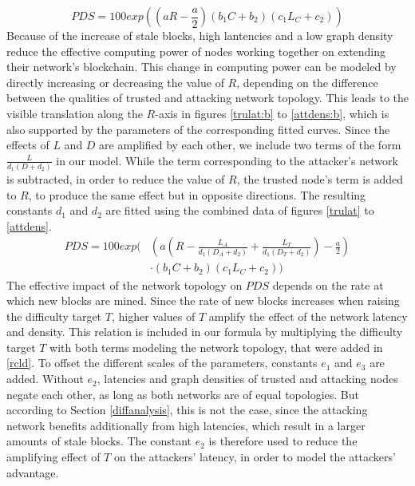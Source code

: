 \documentclass[a4paper,12pt,twoside]{report}
\begin{document}
\begin{equation}\label{rcl}
PDS = 100 exp \left( \left( a R- \frac{a}{2} \right) \left( b_1C+b_2 \right) \left( c_1L_C+c_2 \right) \right)
\end{equation}
Because of the increase of stale blocks, high lantencies and a low graph density reduce the effective computing power of nodes working together on extending their network's blockchain. This change in computing power can be modeled by directly increasing or decreasing the value of $R$, depending on the difference between the qualities of trusted and attacking network topology. This leads to the visible translation along the $R$-axis in figures \ref{trulat:b} to \ref{attdens:b}, which is also supported by the parameters of the corresponding fitted curves.  Since the effects of $L$ and $D$ are amplified by each other, we include two terms of the form $\frac{L}{d_1(D+d_2)}$ in our model. While the term corresponding to the attacker's network is subtracted, in order to reduce the value of $R$, the trusted node's term is added to $R$, to produce the same effect but in opposite directions. The resulting constants $d_1$ and $d_2$ are fitted using the combined data of figures \ref{trulat} to \ref{attdens}.
\begin{equation}\label{rcld}
\begin{split}
PDS = 100 exp \Biggl( & \left( a \left( R-\frac{ L_A}{d_1 \left( D_A+d_2 \right)}+\frac{ L_T}{d_1 \left( D_T+d_2 \right)} \right) - \frac{a}{2} \right) \\
           & \cdot \left( b_1C+b_2 \right) \left( c_1L_C+c_2 \right) \Biggr)
\end{split}
\end{equation}
The effective impact of the network topology on $PDS$ depends on the rate at which new blocks are mined. Since the rate of new blocks increases when raising the difficulty target $T$, higher values of $T$ amplify the effect of the network latency and density. This relation is included in our formula by multiplying the difficulty target $T$ with both terms modeling the network topology, that were added in \autoref{rcld}. To offset the different scales of the parameters, constants $e_1$ and $e_3$ are added. Without $e_2$, latencies and graph densities of trusted and attacking nodes negate each other, as long as both networks are of equal topologies. But according to Section \ref{diffanalysis}, this is not the case, since the attacking network benefits additionally from high latencies, which result in a larger amounts of stale blocks. The constant $e_2$ is therefore used to reduce the amplifying effect of $T$ on the attackers' latency, in order to model the attackers' advantage.
\end{document}
